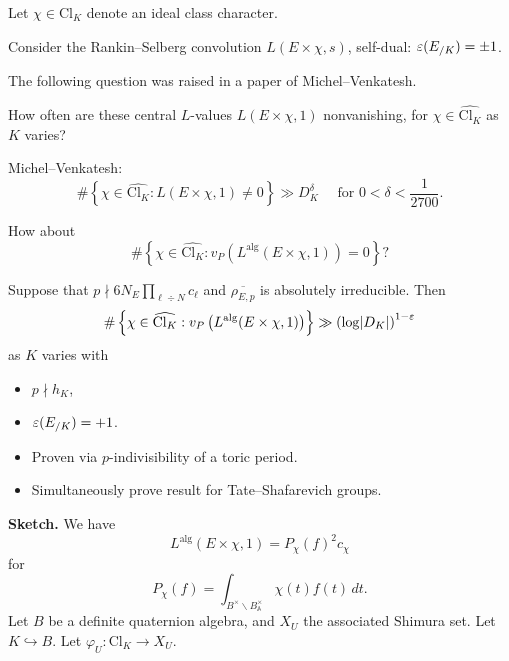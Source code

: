 \documentclass[reqno]{amsart} 
\begin{document}
Let $\chi \in \mathrm{Cl}_K$ denote an ideal class character.

Consider the Rankin--Selberg convolution $L(E \times \chi, s)$, self-dual: $\varepsilon(E_{/K}) = \pm 1$.

The following question was raised in a paper of Michel--Venkatesh.
\begin{question}
  How often are these central $L$-values $L(E \times \chi, 1)$ nonvanishing, for $\chi \in \widehat{\mathrm{Cl}_K}$ as $K$ varies?
\end{question}

Michel--Venkatesh:
\begin{equation*}
  \# \left\{ \chi \in \widehat{\mathrm{Cl}_K}
    :
    L(E \times \chi, 1) \neq 0
  \right\}
  \gg D_K^\delta \quad \text{ for } 0 < \delta < \frac{1}{2700}.
\end{equation*}

\begin{question}
  How about
\begin{equation*}
  \# \left\{ \chi \in \widehat{\mathrm{Cl}_K} : v_P \left( L^{\mathrm{alg}}(E \times \chi, 1) \right) = 0 \right\}?
\end{equation*}
\end{question}
\begin{theorem}
  Suppose that $p \nmid 6 N_E \prod_{\ell \div N} c_{\ell}$ and $\overline{\rho_{E, p}}$ is absolutely irreducible.  Then
  \begin{equation*}
    \# \left\{ \chi \in \widehat{\mathrm{Cl}_K} : v_P \left( L^{\mathrm{alg}}(E \times \chi, 1) \right) \right\}
    \gg \left( \log \lvert D_K \rvert \right)^{1 - \varepsilon}
  \end{equation*}
  as $K$ varies with
  \begin{itemize}
  \item $p \nmid h_K$,
  \item $\varepsilon(E_{/K}) = +1$.
  \end{itemize}
\end{theorem}

\begin{remark}
  \begin{itemize}
  \item Proven via $p$-indivisibility of a toric period.
  \item Simultaneously prove result for Tate--Shafarevich groups.
  \end{itemize}
\end{remark}

\textbf{Sketch.}  We have
\begin{equation*}
  L^{\mathrm{alg}}(E \times \chi, 1) = P_\chi(f)^2 c_\chi
\end{equation*}
for
\begin{equation*}
  P_\chi(f) = \int_{B^\times \backslash B^\times_{\mathbb{A}}} \chi(t) f(t) \, d t.
\end{equation*}
Let $B$ be a definite quaternion algebra, and $X_U$ the associated Shimura set.  Let $K \hookrightarrow B$.  Let $\varphi_U : \mathrm{Cl}_K \rightarrow X_U$.
\end{document}
